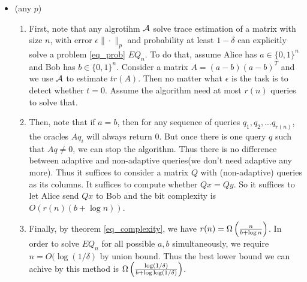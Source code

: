 {\begin{itemize}
\begin{enumerate}
        \item  Finally, it's easy to check bit complexity each round is $O(\log(2^b n))=O(b+\log n)$. Therefore, by theorem \ref{ort_complexity},
        we have $r(n)\cdot O(n(b+\log n))=\Omega(n^2)$, thus $r(n)=\Omega\bbr{\frac{n}{b+\log n}}$. Since $\delta'=O(1)$, the analysis above only
        works for $n=O(1/\epsilon^p)$, thus the best lower bound we can achieve by this method is $r(1/\epsilon^p)=\Omega\bbr{\frac{1}{\epsilon^p(b+\log(1/\epsilon))}}$.
        Combine this and the results below we obtain the final bound.
    \end{enumerate}
    \item (any $p$)
    \begin{enumerate}
        \item First, note that any algrotihm $\mathcal{A}$ solve trace estimation of a matrix with size $n$, 
        with error $\epsilon\|\cdot\|_p$ and probability at least $1-\delta$ can explicitly solve a problem \ref{eq_prob} $EQ_n$. 
        To do that, assume Alice has $a\in\{0,1\}^n$ and Bob has $b\in\{0,1\}^n$. Consider a matrix $A=(a-b)(a-b)^T$ and we use $\mathcal{A}$ to estimate $tr(A)$. 
        Then no matter what $\epsilon$ is the task is to detect whether $t=0$.
        Assume the algorithm need at most $r(n)$ queries to solve that.
        
        \item Then, note that if $a=b$, then for any sequence of queries $q_1,q_2,...q_{r(n)}$, the oracles $Aq_i$ will always return $0$. 
        But once there is one query $q$ such that $Aq\neq 0$, we can stop the algorithm. Thus there is no difference between adaptive and non-adaptive queries(we don't need adaptive any more).
        Thus it suffices to consider a matrix $Q$ with (non-adaptive) queries as its columns. It suffices to compute whether $Qx=Qy$. So it suffices to let Alice send $Qx$ to Bob
        and the bit complexity is $O(r(n)(b+\log n))$.
        
        \item Finally, by theorem \ref{eq_complexity}, we have $r(n)=\Omega\bbr{\frac{n}{b+\log n}}$. In order to solve $EQ_n$ for all possible $a,b$ simultaneously,
        we require $n=O(\log(1/\delta)$ by union bound. Thus the best lower bound we can achive by this method is $\Omega\left(\frac{\log(1/\delta)}{b+\log\log(1/\delta)}\right)$.
        

\end{enumerate}
\end{itemize}}
